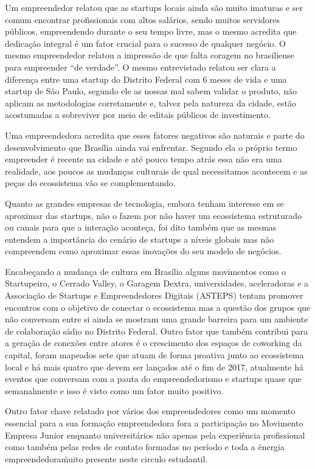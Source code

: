 Um empreendedor relatou que as startups locais ainda são muito imaturas e ser comum encontrar profissionais com altos salários, sendo muitos servidores públicos, empreendendo durante o seu tempo livre, mas o mesmo acredita que dedicação integral é um fator crucial para o sucesso de qualquer negócio. O mesmo empreendedor relatou a impressão de que falta coragem no brasiliense para empreender ``de verdade''. O mesmo entrevistado relatou ser clara a diferença entre uma startup do Distrito Federal com 6 meses de vida e uma startup de São Paulo, segundo ele as nossas mal sabem validar o produto, não aplicam as metodologias corretamente e, talvez pela natureza da cidade, estão acostumadas a sobreviver por meio de editais públicos de investimento.

Uma empreendedora acredita que esses fatores negativos são naturais e parte do desenvolvimento que Brasília ainda vai enfrentar. Segundo ela o próprio termo empreender é recente na cidade e até pouco tempo atrás essa não era uma realidade, aos poucos as mudanças culturais de qual necessitamos acontecem e as peças do ecossistema vão se complementando.

Quanto as grandes empresas de tecnologia, embora tenham interesse em se aproximar das startups, não o fazem por não haver um ecossistema estruturado ou canais para que a interação aconteça, foi dito também que as mesmas entendem a importância do cenário de startups a níveis globais mas não compreendem como aproximar essas inovações do seu modelo de negócios. 

Encabeçando a mudança de cultura em Brasília alguns movimentos como o Startupeiro, o Cerrado Valley, o Garagem Dextra, universidades, aceleradoras e a Associação de Startups e Empreendedores Digitais (ASTEPS) tentam promover encontros com o objetivo de conectar o ecossistema mas a questão dos grupos que não conversam entre si ainda se mostram uma grande barreira para um ambiente de colaboração sádio no Distrito Federal. Outro fator que também contribui para a geração de conexões entre atores é o crescimento dos espaços de coworking da capital, foram mapeados sete que atuam de forma proativa junto ao ecossistema local e há mais quatro que devem ser lançados até o fim de 2017, atualmente há eventos que conversam com a pauta do empreendedorismo e startups quase que semanalmente e isso é visto como um fator muito positivo. 

Outro fator chave relatado por vários dos empreendedores como um momento essencial para a sua formação empreendedora fora a participação no Movimento Empresa Junior enquanto universitários não apenas pela experiência profissional como também pelas redes de contato formadas no período e toda a \"energia empreendedora\" muito presente neste circulo estudantil. 

